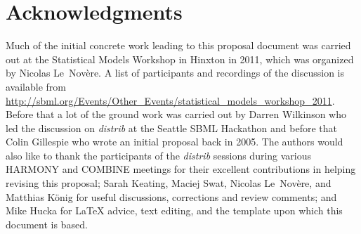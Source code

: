 \documentclass[draftspec]{sbmlpkgspec}
\newcommand{\distribshort}{\emph{distrib}\xspace}
\begin{document}






\appendix




\section{Acknowledgments}
\label{sec:acknowledgments}

Much of the initial concrete work leading to this proposal document
was carried out at the Statistical Models Workshop in Hinxton in 2011,
which was organized by Nicolas Le~Nov\`{e}re. A list of participants
and recordings of the discussion is available from
\url{http://sbml.org/Events/Other_Events/statistical_models_workshop_2011}.
Before that a lot of the ground work was carried out by Darren
Wilkinson who led the discussion on \distribshort at the Seattle SBML
Hackathon and before that Colin Gillespie who wrote an initial
proposal back in 2005. The authors would also like to thank the
participants of the \distribshort sessions during various HARMONY and
COMBINE meetings for their excellent contributions in helping revising
this proposal; Sarah Keating, Maciej Swat, Nicolas Le~Nov\`{e}re, and Matthias K\"{o}nig
for useful discussions, corrections and review comments; and Mike
Hucka for \LaTeX{} advice, text editing, and the template upon which this
document is based.

\appendix



%
%





\end{document}
